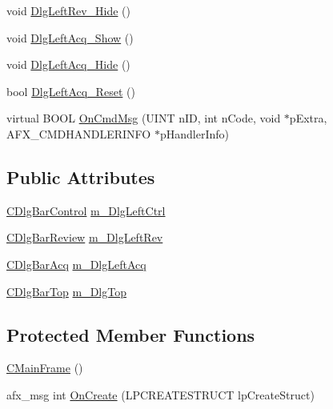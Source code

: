 \begin{DoxyCompactItemize}
\item 
void \hyperlink{classCMainFrame_acb8c5f6aeface1393941abefea11112d}{DlgLeftRev\_\-Hide} ()
\item 
void \hyperlink{classCMainFrame_a46cb6f35c6d3f41cf3c831e3d75dc689}{DlgLeftAcq\_\-Show} ()
\item 
void \hyperlink{classCMainFrame_a0a11a7a661082094f109d7c10229cea9}{DlgLeftAcq\_\-Hide} ()
\item 
bool \hyperlink{classCMainFrame_a404e620451487a56ab741ff592c96527}{DlgLeftAcq\_\-Reset} ()
\item 
virtual BOOL \hyperlink{classCMainFrame_ade959eb0bab719bf06bb9b18ee407101}{OnCmdMsg} (UINT nID, int nCode, void $\ast$pExtra, AFX\_\-CMDHANDLERINFO $\ast$pHandlerInfo)
\end{DoxyCompactItemize}
\subsection*{Public Attributes}
\begin{DoxyCompactItemize}
\item 
\hyperlink{classCDlgBarControl}{CDlgBarControl} \hyperlink{classCMainFrame_a8579281ed025c8a7c6aaa06aa4a41c2a}{m\_\-DlgLeftCtrl}
\item 
\hyperlink{classCDlgBarReview}{CDlgBarReview} \hyperlink{classCMainFrame_ae0e57c519c845b8d52e03f899253ff84}{m\_\-DlgLeftRev}
\item 
\hyperlink{classCDlgBarAcq}{CDlgBarAcq} \hyperlink{classCMainFrame_a4f072ce2952caf08ac3bfa7d95615eeb}{m\_\-DlgLeftAcq}
\item 
\hyperlink{classCDlgBarTop}{CDlgBarTop} \hyperlink{classCMainFrame_a0d47ffaae457eff994867478019bbc69}{m\_\-DlgTop}
\end{DoxyCompactItemize}
\subsection*{Protected Member Functions}
\begin{DoxyCompactItemize}
\item 
\hyperlink{classCMainFrame_af3e997aeae4148d2aaa4a1e1ae7bdd53}{CMainFrame} ()
\item 
afx\_\-msg int \hyperlink{classCMainFrame_a48666466fd37412fcaeff75c3b12e0ed}{OnCreate} (LPCREATESTRUCT lpCreateStruct)
\end{DoxyCompactItemize}
